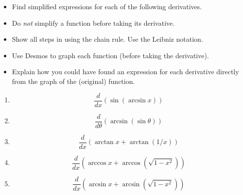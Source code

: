 \documentclass{ximera}
\begin{document}
\begin{exercise}  \label{Ehglkhfgjsdafn}
\begin{itemize}
\item Find simplified expressions for each of the following derivatives. 

\item Do \emph{not} simplify a function before taking its derivative. 

\item Show all steps in using the chain rule. Use the Leibniz notation. 

\item Use Desmos to graph each function (before taking the derivative).

\item Explain how you could have found an expression for each derivative directly from the graph of the (original) function. 

\end{itemize}

\begin{enumerate}
\item
\[
       \frac{d}{dx}\left( \sin(\arcsin x ) \right)
\]

\item 
\[
       \frac{d}{d\theta}\left( \arcsin(\sin \theta ) \right)
\]

\item 
\[
  \frac{d}{dx}\left( \arctan x + \arctan(1/x)  \right)
\]

\item
\[
    \frac{d}{dx}\left( \arccos x + \arccos\left(\sqrt{1-x^2}\right)  \right)
\] 

\item
\[
    \frac{d}{dx}\left( \arcsin x + \arcsin\left(\sqrt{1-x^2}\right)  \right)
\] 
\end{enumerate}

\end{exercise}
\end{document}
